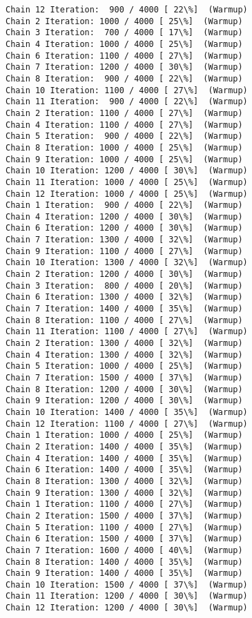 \documentclass[11pt]{article}
\begin{document}
\begin{Verbatim}[commandchars=\\\{\}]
Chain 12 Iteration:  900 / 4000 [ 22\%]  (Warmup)
Chain 2 Iteration: 1000 / 4000 [ 25\%]  (Warmup)
Chain 3 Iteration:  700 / 4000 [ 17\%]  (Warmup)
Chain 4 Iteration: 1000 / 4000 [ 25\%]  (Warmup)
Chain 6 Iteration: 1100 / 4000 [ 27\%]  (Warmup)
Chain 7 Iteration: 1200 / 4000 [ 30\%]  (Warmup)
Chain 8 Iteration:  900 / 4000 [ 22\%]  (Warmup)
Chain 10 Iteration: 1100 / 4000 [ 27\%]  (Warmup)
Chain 11 Iteration:  900 / 4000 [ 22\%]  (Warmup)
Chain 2 Iteration: 1100 / 4000 [ 27\%]  (Warmup)
Chain 4 Iteration: 1100 / 4000 [ 27\%]  (Warmup)
Chain 5 Iteration:  900 / 4000 [ 22\%]  (Warmup)
Chain 8 Iteration: 1000 / 4000 [ 25\%]  (Warmup)
Chain 9 Iteration: 1000 / 4000 [ 25\%]  (Warmup)
Chain 10 Iteration: 1200 / 4000 [ 30\%]  (Warmup)
Chain 11 Iteration: 1000 / 4000 [ 25\%]  (Warmup)
Chain 12 Iteration: 1000 / 4000 [ 25\%]  (Warmup)
Chain 1 Iteration:  900 / 4000 [ 22\%]  (Warmup)
Chain 4 Iteration: 1200 / 4000 [ 30\%]  (Warmup)
Chain 6 Iteration: 1200 / 4000 [ 30\%]  (Warmup)
Chain 7 Iteration: 1300 / 4000 [ 32\%]  (Warmup)
Chain 9 Iteration: 1100 / 4000 [ 27\%]  (Warmup)
Chain 10 Iteration: 1300 / 4000 [ 32\%]  (Warmup)
Chain 2 Iteration: 1200 / 4000 [ 30\%]  (Warmup)
Chain 3 Iteration:  800 / 4000 [ 20\%]  (Warmup)
Chain 6 Iteration: 1300 / 4000 [ 32\%]  (Warmup)
Chain 7 Iteration: 1400 / 4000 [ 35\%]  (Warmup)
Chain 8 Iteration: 1100 / 4000 [ 27\%]  (Warmup)
Chain 11 Iteration: 1100 / 4000 [ 27\%]  (Warmup)
Chain 2 Iteration: 1300 / 4000 [ 32\%]  (Warmup)
Chain 4 Iteration: 1300 / 4000 [ 32\%]  (Warmup)
Chain 5 Iteration: 1000 / 4000 [ 25\%]  (Warmup)
Chain 7 Iteration: 1500 / 4000 [ 37\%]  (Warmup)
Chain 8 Iteration: 1200 / 4000 [ 30\%]  (Warmup)
Chain 9 Iteration: 1200 / 4000 [ 30\%]  (Warmup)
Chain 10 Iteration: 1400 / 4000 [ 35\%]  (Warmup)
Chain 12 Iteration: 1100 / 4000 [ 27\%]  (Warmup)
Chain 1 Iteration: 1000 / 4000 [ 25\%]  (Warmup)
Chain 2 Iteration: 1400 / 4000 [ 35\%]  (Warmup)
Chain 4 Iteration: 1400 / 4000 [ 35\%]  (Warmup)
Chain 6 Iteration: 1400 / 4000 [ 35\%]  (Warmup)
Chain 8 Iteration: 1300 / 4000 [ 32\%]  (Warmup)
Chain 9 Iteration: 1300 / 4000 [ 32\%]  (Warmup)
Chain 1 Iteration: 1100 / 4000 [ 27\%]  (Warmup)
Chain 2 Iteration: 1500 / 4000 [ 37\%]  (Warmup)
Chain 5 Iteration: 1100 / 4000 [ 27\%]  (Warmup)
Chain 6 Iteration: 1500 / 4000 [ 37\%]  (Warmup)
Chain 7 Iteration: 1600 / 4000 [ 40\%]  (Warmup)
Chain 8 Iteration: 1400 / 4000 [ 35\%]  (Warmup)
Chain 9 Iteration: 1400 / 4000 [ 35\%]  (Warmup)
Chain 10 Iteration: 1500 / 4000 [ 37\%]  (Warmup)
Chain 11 Iteration: 1200 / 4000 [ 30\%]  (Warmup)
Chain 12 Iteration: 1200 / 4000 [ 30\%]  (Warmup)

\end{Verbatim}
\end{document}
